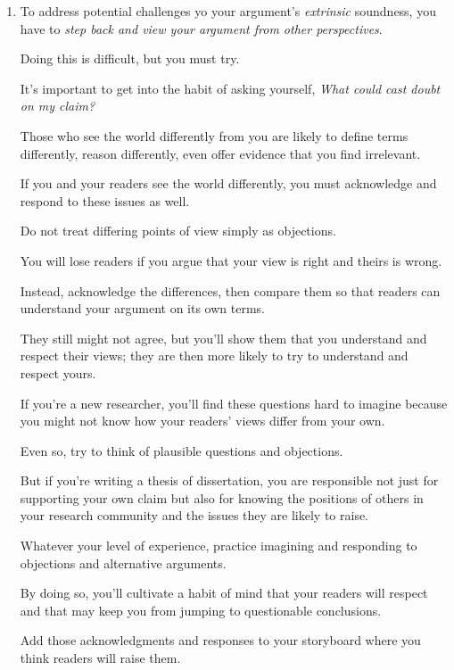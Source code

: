 \documentclass[oneside]{book}
\numberwithin{equation}{section}
\begin{document}
\begin{enumerate}
    Next, imagine these kinds of reservations about your reasons and how you would answer them:
    \begin{itemize}
        \item Your reasons are inconsistent or contradictory.
        \item They are too weak or too few to support your claim.
        \item They are irrelevant to your claim. (We discuss this matter in \textbf{5.4.4}.)
    \end{itemize}
    \item To address potential challenges yo your argument's \textit{extrinsic} soundness, you have to \textit{step back and view your argument from other perspectives}.
    
    Doing this is difficult, but you must try.
    
    It's important to get into the habit of asking yourself, \textit{What could cast doubt on my claim?}
    
    Those who see the world differently from you are likely to define terms differently, reason differently, even offer evidence that you find irrelevant.
    
    If you and your readers see the world differently, you must acknowledge and respond to these issues as well.
    
    Do not treat differing points of view simply as objections.
    
    You will lose readers if you argue that your view is right and theirs is wrong.
    
    Instead, acknowledge the differences, then compare them so that readers can understand your argument on its own terms.
    
    They still might not agree, but you'll show them that you understand and respect their views; they are then more likely to try to understand and respect yours.
    
    If you're a new researcher, you'll find these questions hard to imagine because you might not know how your readers' views differ from your own.
    
    Even so, try to think of plausible questions and objections.
    
    But if you're writing a thesis of dissertation, you are responsible not just for supporting your own claim but also for knowing the positions of others in your research community and the issues they are likely to raise.
    
    Whatever your level of experience, practice imagining and responding to objections and alternative arguments.
    
    By doing so, you'll cultivate a habit of mind that your readers will respect and that may keep you from jumping to questionable conclusions.
    
    Add those acknowledgments and responses to your storyboard where you think readers will raise them.
\end{enumerate}
\end{document}
